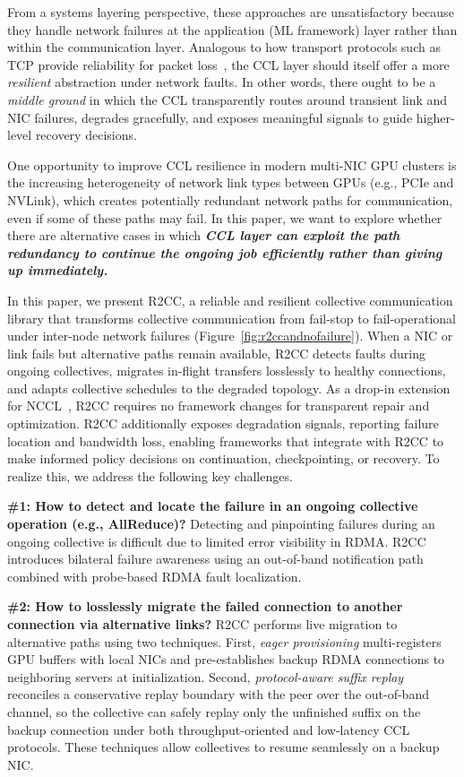 From a systems layering perspective, these approaches are unsatisfactory because they handle network failures at the application (ML framework) layer rather than within the communication layer. Analogous to how transport protocols such as TCP provide reliability for packet loss~\cite{saltzer1984end,zimmermann1980osi}, the CCL layer should itself offer a more \textit{resilient} abstraction under network faults. In other words, there ought to be a \textit{middle ground} in which the CCL transparently routes around transient link and NIC failures, degrades gracefully, and exposes meaningful signals to guide higher-level recovery decisions.

One opportunity to improve CCL resilience in modern multi-NIC GPU clusters is the increasing heterogeneity of network link types between GPUs (e.g., PCIe and NVLink), which creates potentially redundant network paths for communication, even if some of these paths may fail. In this paper, we want to explore whether there are alternative cases in which
\textbf{\textit{CCL layer can exploit the path redundancy to continue the ongoing job efficiently rather than giving up immediately.}}

In this paper, we present R2CC, a reliable and resilient collective communication library that transforms collective communication from fail-stop to fail-operational under inter-node network failures (Figure~\ref{fig:r2ccandnofailure}). When a NIC or link fails but alternative paths remain available, R2CC detects faults during ongoing collectives, migrates in-flight transfers losslessly to healthy connections, and adapts collective schedules to the degraded topology. As a drop-in extension for NCCL~\cite{NCCL}, R2CC requires no framework changes for transparent repair and optimization. R2CC additionally exposes degradation signals, reporting failure location and bandwidth loss, enabling frameworks that integrate with R2CC to make informed policy decisions on continuation, checkpointing, or recovery. To realize this, we address the following key challenges.

{\bf \#1: How to detect and locate the failure in an ongoing collective operation (e.g., AllReduce)?} Detecting and pinpointing failures during an ongoing collective is difficult due to limited error visibility in RDMA. R2CC introduces bilateral failure awareness using an out-of-band notification path combined with probe-based RDMA fault localization.

{\bf \#2: How to losslessly migrate the failed connection to another connection via alternative links?} R2CC performs live migration to alternative paths using two techniques. First, \textit{eager provisioning} multi-registers GPU buffers with local NICs and pre-establishes backup RDMA connections to neighboring servers at initialization. Second, \textit{protocol-aware suffix replay} reconciles a conservative replay boundary with the peer over the out-of-band channel, so the collective can safely replay only the unfinished suffix on the backup connection under both throughput-oriented and low-latency CCL protocols.
These techniques allow collectives to resume seamlessly on a backup NIC.

